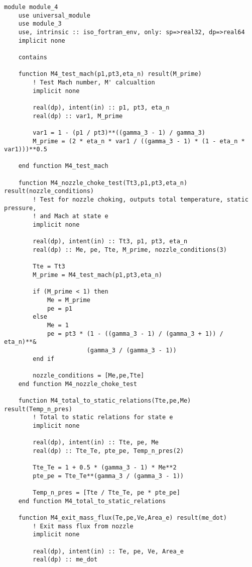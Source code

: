 \begin{verbatim}
module module_4
    use universal_module
    use module_3
    use, intrinsic :: iso_fortran_env, only: sp=>real32, dp=>real64
    implicit none

    contains

    function M4_test_mach(p1,pt3,eta_n) result(M_prime)
        ! Test Mach number, M' calcualtion
        implicit none

        real(dp), intent(in) :: p1, pt3, eta_n
        real(dp) :: var1, M_prime

        var1 = 1 - (p1 / pt3)**((gamma_3 - 1) / gamma_3)
        M_prime = (2 * eta_n * var1 / ((gamma_3 - 1) * (1 - eta_n * var1)))**0.5

    end function M4_test_mach

    function M4_nozzle_choke_test(Tt3,p1,pt3,eta_n) result(nozzle_conditions)
        ! Test for nozzle choking, outputs total temperature, static pressure,
        ! and Mach at state e
        implicit none

        real(dp), intent(in) :: Tt3, p1, pt3, eta_n
        real(dp) :: Me, pe, Tte, M_prime, nozzle_conditions(3)

        Tte = Tt3
        M_prime = M4_test_mach(p1,pt3,eta_n)

        if (M_prime < 1) then
            Me = M_prime
            pe = p1
        else
            Me = 1
            pe = pt3 * (1 - ((gamma_3 - 1) / (gamma_3 + 1)) / eta_n)**& 
                       (gamma_3 / (gamma_3 - 1))
        end if

        nozzle_conditions = [Me,pe,Tte]
    end function M4_nozzle_choke_test

    function M4_total_to_static_relations(Tte,pe,Me) result(Temp_n_pres)
        ! Total to static relations for state e
        implicit none

        real(dp), intent(in) :: Tte, pe, Me
        real(dp) :: Tte_Te, pte_pe, Temp_n_pres(2)

        Tte_Te = 1 + 0.5 * (gamma_3 - 1) * Me**2
        pte_pe = Tte_Te**(gamma_3 / (gamma_3 - 1))

        Temp_n_pres = [Tte / Tte_Te, pe * pte_pe]
    end function M4_total_to_static_relations

    function M4_exit_mass_flux(Te,pe,Ve,Area_e) result(me_dot)
        ! Exit mass flux from nozzle
        implicit none

        real(dp), intent(in) :: Te, pe, Ve, Area_e
        real(dp) :: me_dot


\end{verbatim}
